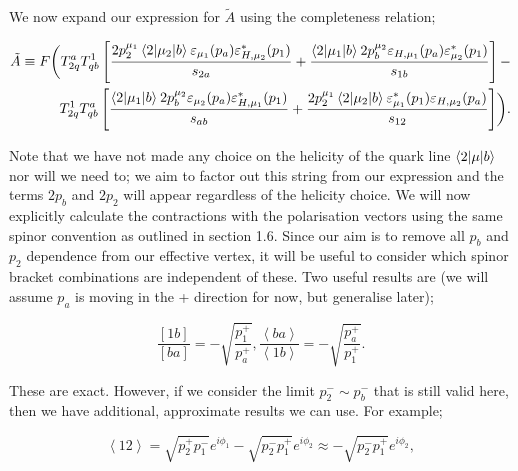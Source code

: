 We now expand our expression for $\tilde{A}$ using the completeness relation;

\begin{equation}
\begin{split}
\tilde{A} \equiv F \biggl( T^a_{2q}T^1_{qb} \left[ \frac{2 p_2^{\mu_1} \mathinner{\langle2\vert\mu_2\vert b\rangle}_{} \varepsilon_{\mu_1} (p_a) \varepsilon_{H,\mu_2}^*(p_1)}{s_{2a}} + \frac{\mathinner{\langle2\vert\mu_1\vert b\rangle}_{} 2 p_b^{\mu_2} \varepsilon_{H,\mu_1}(p_a)\varepsilon^*_{\mu_2}(p_1)}{s_{1b}} \right]
 - \\
T^1_{2q}T^a_{qb} \left[ \frac{\mathinner{\langle2\vert\mu_1\vert b\rangle}_{}2p_b^{\mu_2}\varepsilon_{\mu_2}(p_a)\varepsilon^*_{H,\mu_1}(p_1)}{s_{ab}} + \frac{2p_2^{\mu_1}\mathinner{\langle2\vert\mu_2\vert b\rangle}_{} \varepsilon_{\mu_1}^*(p_1) \varepsilon_{H,\mu_2}(p_a)}{s_{12}} \right] \biggr).
\end{split}
\end{equation}

Note that we have not made any choice on the helicity of the quark line $\mathinner{\langle2\vert\mu\vert b\rangle}_{}$ nor will we need to; we aim to factor out this string from our expression and the terms $2p_b$ and $2p_2$ will appear regardless of the helicity choice. We will now explicitly calculate the contractions with the polarisation vectors using the same spinor convention as outlined in section 1.6. Since our aim is to remove all $p_b$ and $p_2$ dependence from our effective vertex, it will be useful to consider which spinor bracket combinations are independent of these. Two useful results are (we will assume $p_a$ is moving in the + direction for now, but generalise later);

\begin{subequations}
\begin{equation}
\frac{[1b]}{[ba]} = -\sqrt{\frac{p_1^+}{p_a^+}},
\end{equation}
\begin{equation}
\frac{\left<ba\right>}{\left<1b\right>} = -\sqrt{\frac{p_a^+}{p_1^+}}.
\end{equation}
\end{subequations}

These are exact. However, if we consider the limit $p_2^- \sim p_b^-$ that is still valid here, then we have additional, approximate results we can use. For example;

\begin{equation}
\left<1 2 \right> = \sqrt{p_2^+ p_1^-} e^{i \phi_1} - \sqrt{p_2^- p_1^+}e^{i \phi_2} \approx  - \sqrt{p_2^- p_1^+}e^{i \phi_2},
\end{equation}

